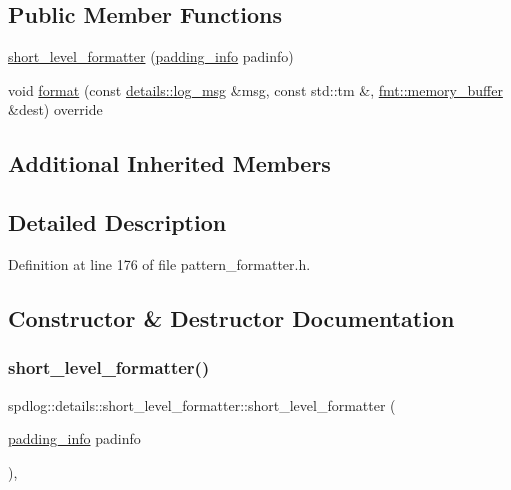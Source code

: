 \subsection*{Public Member Functions}
\begin{DoxyCompactItemize}
\item 
\hyperlink{classspdlog_1_1details_1_1short__level__formatter_adcc003358c5cea986bb25ae092df0f70}{short\+\_\+level\+\_\+formatter} (\hyperlink{structspdlog_1_1details_1_1padding__info}{padding\+\_\+info} padinfo)
\item 
void \hyperlink{classspdlog_1_1details_1_1short__level__formatter_acf241e8ab58e6142e02a9c493034f81d}{format} (const \hyperlink{structspdlog_1_1details_1_1log__msg}{details\+::log\+\_\+msg} \&msg, const std\+::tm \&, \hyperlink{format_8h_a21cbf729f69302f578e6db21c5e9e0d2}{fmt\+::memory\+\_\+buffer} \&dest) override
\end{DoxyCompactItemize}
\subsection*{Additional Inherited Members}


\subsection{Detailed Description}


Definition at line 176 of file pattern\+\_\+formatter.\+h.



\subsection{Constructor \& Destructor Documentation}
\mbox{\label{classspdlog_1_1details_1_1short__level__formatter_adcc003358c5cea986bb25ae092df0f70}} 
\subsubsection{\texorpdfstring{short\+\_\+level\+\_\+formatter()}{short\_level\_formatter()}}
{\footnotesize\ttfamily spdlog\+::details\+::short\+\_\+level\+\_\+formatter\+::short\+\_\+level\+\_\+formatter (\begin{DoxyParamCaption}\item[{\hyperlink{structspdlog_1_1details_1_1padding__info}{padding\+\_\+info}}]{padinfo }\end{DoxyParamCaption})\hspace{0.3cm}{\ttfamily [inline]}, {\ttfamily [explicit]}}



